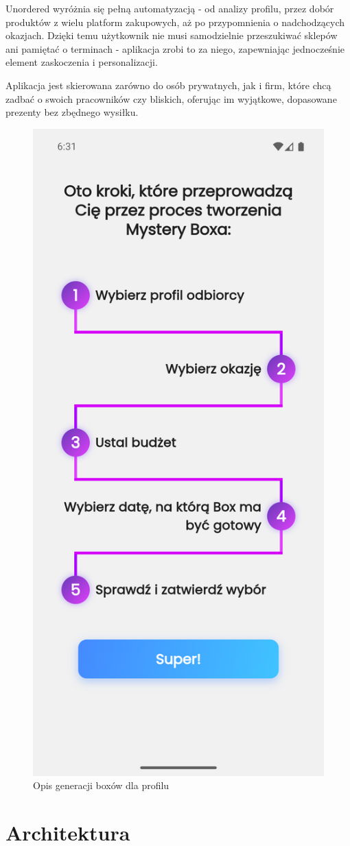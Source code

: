 \documentclass[a4paper, 12pt]{article}
\begin{document}
Unordered wyróżnia się pełną automatyzacją - od analizy profilu, przez dobór produktów z wielu platform zakupowych,
aż po przypomnienia o nadchodzących okazjach. Dzięki temu użytkownik nie musi samodzielnie przeszukiwać sklepów ani
pamiętać o terminach - aplikacja zrobi to za niego, zapewniając jednocześnie element zaskoczenia i personalizacji.

Aplikacja jest skierowana zarówno do osób prywatnych, jak i firm, które chcą zadbać o swoich pracowników
czy bliskich, oferując im wyjątkowe, dopasowane prezenty bez zbędnego wysiłku.

\begin{figure}[H]
    \centering
    \includegraphics[width=0.3\linewidth,keepaspectratio]{images/box_desc.png}
    \caption{Opis generacji boxów dla profilu}
    \label{fig:box-desc}
\end{figure}

\newpage

\section{Architektura}
\end{document}
